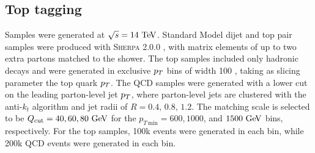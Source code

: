 \subsection{Top tagging} \label{sec:top-samples}
Samples were generated at $\sqrt{s}=14\TeV$. Standard Model dijet and top pair
samples were produced with \textsc{Sherpa} 2.0.0 \cite{Gleisberg:2008ta,Schumann:2007mg,Krauss:2001iv,Gleisberg:2008fv,Hoeche:2009rj,Schonherr:2008av}, with matrix elements of up
to two extra partons matched to the shower. The top samples included only
hadronic decays and  were generated in exclusive $p_T$ bins of width 100 \GeV,
taking as slicing parameter the top quark $p_T$. The QCD samples 
 were generated with a lower cut on the leading parton-level jet $p_T$, where
parton-level jets are clustered with the anti-$k_t$ algorithm and jet radii of
$R= 0.4,\,0.8,\,1.2$. The matching scale is selected to be $Q_{\rm cut}=40, 60, 80 \GeV$ for
the $p_{T\,\text{min}}=600, 1000$, and $1500 \GeV$ bins, respectively. For the top samples, 100k 
events were generated in each bin, while 200k QCD events were generated in each bin.
